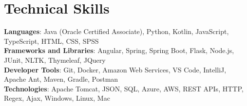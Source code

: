 \documentclass[letterpaper,11pt]{article}
\begin{document}
\section{Technical Skills}
 \begin{itemize}[leftmargin=0.15in, label={}]
    \small{\item{
     \textbf{Languages}{: Java (Oracle Certified Associate), Python, Kotlin, JavaScript, TypeScript, HTML, CSS, SPSS} \\
     \textbf{Frameworks and Libraries}{: Angular, Spring, Spring Boot, Flask, Node.js, JUnit, NLTK, Thymeleaf, JQuery} \\
     \textbf{Developer Tools}{: Git, Docker, Amazon Web Services, VS Code, IntelliJ, Apache Ant, Maven, Gradle, Postman} \\
     \textbf{Technologies}{: Apache Tomcat, JSON, SQL, Azure, AWS, REST APIs, HTTP, Regex, Ajax, Windows, Linux, Mac} \\
    }}
 \end{itemize}


\end{document}
